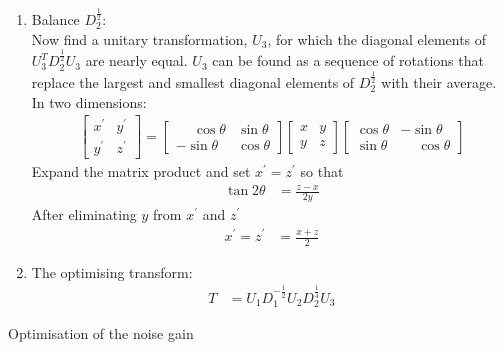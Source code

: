 \documentclass[a4paper,twoside,10pt,english]{report}
\begin{document}
\begin{algorithm}[!hptb]
\begin{enumerate}
\item Balance $D_{2}^{\frac{1}{2}}$:\\
Now find a unitary transformation, $U_{3}$, for which
the diagonal elements of $U_{3}^{T}D_{2}^{\frac{1}{2}}U_{3}$
are nearly equal. $U_{3}$ can be found as a sequence of rotations
that replace the largest and smallest diagonal elements of $D_{2}^{\frac{1}{2}}$
with their average. In two dimensions:
\begin{align*}
\left[\begin{array}{cc}
x^{\prime} & y^{\prime}\\
y^{\prime} & z^{\prime}
\end{array}\right]
=
\left[\begin{array}{cc}
\phantom{-}\cos \theta & \sin \theta\\
-\sin \theta & \cos\theta
\end{array}\right]
\left[\begin{array}{cc}
x & y\\
y & z
\end{array}\right]
\left[\begin{array}{cc}
\cos \theta & -\sin \theta\\
\sin \theta & \phantom{-}\cos\theta
\end{array}\right]
\end{align*}
Expand the matrix product and set $x^{\prime}=z^{\prime}$ so that
\begin{align*}
  \tan 2\theta&=\frac{z-x}{2y}
\end{align*}
After eliminating $y$ from $x^{\prime}$ and
$z^{\prime}$
\begin{align*}
x^{\prime}=z^{\prime}&=\frac{x+z}{2}
\end{align*}

\item The optimising transform:
\begin{align*}
T&=U_{1}D_{1}^{-\frac{1}{2}}U_{2}D_{2}^{\frac{1}{4}}U_{3}
\end{align*}
\end{enumerate}
\caption{Optimisation of the noise gain}
\label{alg:Optimisation-of-the-noise-gain}
\end{algorithm}
\end{document}
